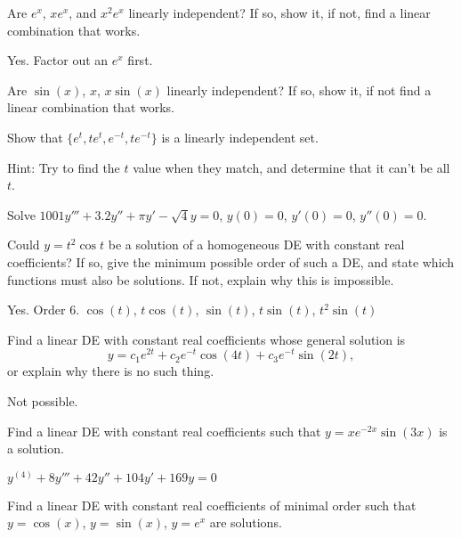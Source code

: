 \begin{exercise}
Are $e^x$, $xe^x$, and $x^2e^x$
linearly independent?  If so, show
it, if not, find a linear combination that works.
\end{exercise}
\comboSol{%
}
{%
Yes. Factor out an $e^x$ first.
}

\begin{exercise}\ansMark%
Are $\sin(x)$, $x$, $x\sin(x)$ linearly independent?
If so, show it, if not find a linear combination that works.
\end{exercise}

\begin{exercise}
Show that $\{e^t, te^t, e^{-t}, te^{-t}\}$ is a linearly independent set.
\end{exercise}
\comboSol{%
}
{%
Hint: Try to find the $t$ value when they match, and determine that it can't be all $t$. 
}

\begin{exercise}\ansMark%
Solve $1001y'''+3.2y''+\pi y'-\sqrt{4} y = 0$, $y(0)=0$, $y'(0) = 0$,
$y''(0) = 0$.
\end{exercise}

\begin{exercise}
Could $y=t^2\cos t$ be a solution of a homogeneous DE with constant real coefficients? %
If so, give the minimum possible order of such a DE, and state which functions must also be solutions. If not, explain why this is impossible.
\end{exercise}
\comboSol{%
}
{%
Yes. Order 6. $\cos(t)$, $t\cos(t)$, $\sin(t)$, $t\sin(t)$, $t^2\sin(t)$
}

\begin{exercise}
Find a linear DE with constant real coefficients whose general solution is $$y=c_1e^{2t}+ c_2e^{-t}\cos(4t) + c_3e^{-t}\sin(2t),$$ %
or explain why there is no such thing.
\end{exercise}
\comboSol{%
}
{%
Not possible.
}

\begin{exercise}
Find a linear DE with constant real coefficients such that $y=xe^{-2x}\sin(3x)$ is a solution.
\end{exercise}
\comboSol{%
}
{%
$y^{(4)} + 8y''' + 42y'' + 104y' + 169y = 0$
}

\begin{exercise}\ansMark%
Find a linear DE with constant real coefficients of minimal order such that $y=\cos(x)$, $y=\sin(x)$, $y=e^x$ are solutions.
\end{exercise}

